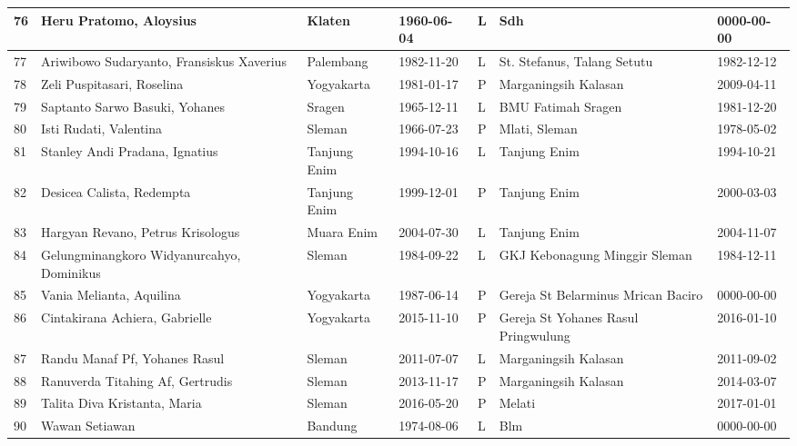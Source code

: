 \begin{longtable}{|m{5mm}|m{45mm}|m{20mm}|m{20mm}|m{5mm}|m{25mm}|m{20mm}|}
	76&Heru Pratomo, Aloysius&Klaten&1960-06-04&L&Sdh&0000-00-00\\ \hline 
	77&Ariwibowo Sudaryanto, Fransiskus Xaverius&Palembang&1982-11-20&L&St. Stefanus, Talang Setutu&1982-12-12\\ \hline 
	78&Zeli Puspitasari, Roselina&Yogyakarta&1981-01-17&P&Marganingsih Kalasan&2009-04-11\\ \hline 
	79&Saptanto Sarwo Basuki, Yohanes&Sragen&1965-12-11&L&BMU Fatimah Sragen&1981-12-20\\ \hline 
	80&Isti Rudati, Valentina&Sleman&1966-07-23&P&Mlati, Sleman&1978-05-02\\ \hline 
	81&Stanley Andi Pradana, Ignatius&Tanjung Enim&1994-10-16&L&Tanjung Enim&1994-10-21\\ \hline 
	82&Desicea Calista, Redempta&Tanjung Enim&1999-12-01&P&Tanjung Enim&2000-03-03\\ \hline 
	83&Hargyan Revano, Petrus Krisologus&Muara Enim&2004-07-30&L&Tanjung Enim&2004-11-07\\ \hline 
	84&Gelungminangkoro Widyanurcahyo, Dominikus&Sleman&1984-09-22&L&GKJ Kebonagung Minggir Sleman&1984-12-11\\ \hline 
	85&Vania Melianta, Aquilina &Yogyakarta&1987-06-14&P&Gereja St Belarminus Mrican Baciro&0000-00-00\\ \hline 
	86&Cintakirana Achiera, Gabrielle&Yogyakarta&2015-11-10&P&Gereja St Yohanes Rasul Pringwulung&2016-01-10\\ \hline 
	87&Randu Manaf Pf, Yohanes Rasul&Sleman&2011-07-07&L&Marganingsih Kalasan&2011-09-02\\ \hline 
	88&Ranuverda Titahing Af, Gertrudis&Sleman&2013-11-17&P&Marganingsih Kalasan&2014-03-07\\ \hline 
	89&Talita Diva Kristanta, Maria&Sleman&2016-05-20&P&Melati&2017-01-01\\ \hline 
	90&Wawan Setiawan&Bandung&1974-08-06&L&Blm&0000-00-00\\ \hline 
\end{longtable}